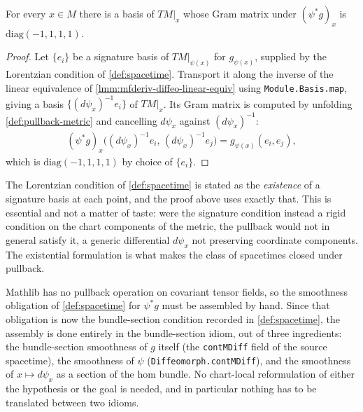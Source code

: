 \begin{lemma}
    \label{lmm:pullback-metric-lorentzian}
    For every $x \in M$ there is a basis of $TM|_x$ whose Gram matrix under $(\psi^*g)_x$ is $\mathrm{diag}(-1,1,1,1)$.
\end{lemma}
\begin{proof}
    Let $\{e_i\}$ be a signature basis of $TM|_{\psi(x)}$ for $g_{\psi(x)}$, supplied by the Lorentzian condition of \ref{def:spacetime}. Transport it along the inverse of the linear equivalence of \ref{lmm:mfderiv-diffeo-linear-equiv} using \texttt{Module.Basis.map}, giving a basis $\{(d\psi_x)^{-1}e_i\}$ of $TM|_x$. Its Gram matrix is computed by unfolding \ref{def:pullback-metric} and cancelling $d\psi_x$ against $(d\psi_x)^{-1}$:
    \begin{align}
        (\psi^*g)_x\big((d\psi_x)^{-1}e_i,\, (d\psi_x)^{-1}e_j\big) = g_{\psi(x)}(e_i, e_j),
    \end{align}
    which is $\mathrm{diag}(-1,1,1,1)$ by choice of $\{e_i\}$.
\end{proof}

The Lorentzian condition of \ref{def:spacetime} is stated as the \emph{existence} of a signature basis at each point, and the proof above uses exactly that. This is essential and not a matter of taste: were the signature condition instead a rigid condition on the chart components of the metric, the pullback would not in general satisfy it, a generic differential $d\psi_x$ not preserving coordinate components. The existential formulation is what makes the class of spacetimes closed under pullback.

Mathlib has no pullback operation on covariant tensor fields, so the smoothness obligation of \ref{def:spacetime} for $\psi^*g$ must be assembled by hand. Since that obligation is now the bundle-section condition recorded in \ref{def:spacetime}, the assembly is done entirely in the bundle-section idiom, out of three ingredients: the bundle-section smoothness of $g$ itself (the \texttt{contMDiff} field of the source spacetime), the smoothness of $\psi$ (\texttt{Diffeomorph.contMDiff}), and the smoothness of $x \mapsto d\psi_x$ as a section of the hom bundle. No chart-local reformulation of either the hypothesis or the goal is needed, and in particular nothing has to be translated between two idioms.


